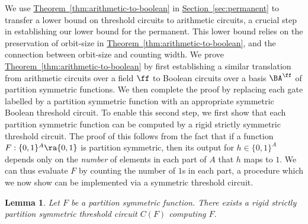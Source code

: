 \documentclass[11pt]{article}
\newcommand{\expref}[2]{\texorpdfstring{\hyperref[#2]{#1~\ref{#2}}}{#1~\ref{#2}}}
\newtheorem{lemma}[theorem]{Lemma}
\begin{document}
We use \expref{Theorem}{thm:arithmetic-to-boolean} in \expref{Section}{sec:permanent} to
transfer a lower bound on threshold circuits to arithmetic circuits, a crucial
step in establishing our lower bound for the permanent. This lower bound relies on the preservation of orbit-size in \expref{Theorem}{thm:arithmetic-to-boolean}, and the connection between orbit-size and counting width.
We prove \expref{Theorem}{thm:arithmetic-to-boolean} by first establishing a similar
translation from arithmetic circuits over a field $\ff$ to Boolean circuits over
a basis $\BA^{\ff}$ 
of partition symmetric functions. We then complete the proof
by replacing each gate labelled by a partition symmetric function with an
appropriate symmetric Boolean threshold circuit.
To enable this second step, we first show that each partition symmetric function
can be computed by a rigid strictly symmetric threshold circuit. The proof of
this follows from the fact that if a function $F: \{0, 1\}^A \ra \{0, 1\}$ is
partition symmetric, then its output for $h \in \{0, 1\}^A$ depends only on the
\emph{number} of elements in each part of $A$ that $h$ maps to $1$. We can thus
evaluate $F$ by counting the number of $1$s in each part, a procedure which we
now show can be implemented via a symmetric threshold circuit.
\begin{lemma}
  Let $F$ be a partition symmetric function. There exists a rigid strictly
  partition symmetric threshold circuit $C(F)$ computing $F$.
  \label{lem:partition-symmetric}
\end{lemma}
\end{document}
